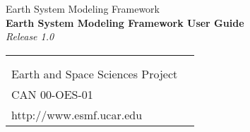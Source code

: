 \documentclass[]{article}
\begin{document}

\begin{titlepage}

\begin{center}
{\Large Earth System Modeling Framework } \\
\vspace{.25in}
{\Large {\bf Earth System Modeling Framework User Guide}} \\
\vspace{.25in}
{\large {\it Release 1.0}}
\vspace{.5in}
\end{center}

\begin{latexonly}
\vspace{5.5in}
\begin{tabular}{p{5in}p{.9in}}
\hrulefill \\
\noindent {\bf NASA High Performance Computing and Communications Program} \\
\noindent Earth and Space Sciences Project \\
\noindent CAN 00-OES-01 \\
\noindent http://www.esmf.ucar.edu \\
\end{tabular}
\end{latexonly}

\end{titlepage}

\tableofcontents

\newpage

\setlength{\parskip}{2ex}
\setlength{\parindent}{0ex}





\newpage








\end{document}
